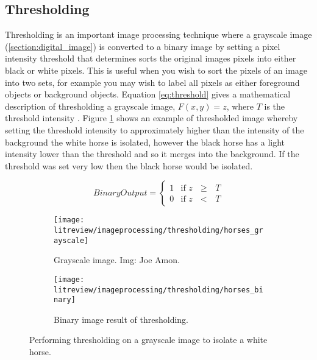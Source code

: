 \subsection{Thresholding}
\label{subsection:thresholding}
Thresholding is an important image processing technique where a grayscale image (\ref{section:digital_image}) is converted to a binary image by setting a pixel intensity threshold that determines sorts the original images pixels into either black or white pixels. This is useful when you wish to sort the pixels of an image into two sets, for example you may wish to label all pixels as either foreground objects or background objects. Equation \ref{eq:threshold} gives a mathematical description of thresholding a grayscale image, $F(x,y) = z$, where $T$ is the threshold intensity \cite{alg_apps}. Figure \ref{fig:threshex} shows an example of thresholded image whereby setting the threshold intensity to approximately higher than the intensity of the background the white horse is isolated, however the black horse has a light intensity lower than the threshold and so it merges into the background. If the threshold was set very low then the black horse would be isolated.

\begin{equation}
  Binary Output = 
  \begin{cases}
    1 & \text{if $z$ $\geq$ $T$} \\
    0 & \text{if $z$ $<$  $T$}
  \end{cases}
  \label{eq:threshold}
\end{equation}

\begin{figure}[H]
	\centering
	    \begin{subfigure}[b]{0.45\linewidth}
      		\centering\texttt{[image: litreview/imageprocessing/thresholding/horses\_grayscale]}
      		\caption{Grayscale image. Img: Joe Amon.}
    	\end{subfigure}
    	\begin{subfigure}[b]{0.45\linewidth}
      		\centering\texttt{[image: litreview/imageprocessing/thresholding/horses\_binary]}
      		\caption{Binary image result of thresholding.}
    	\end{subfigure}
    	\caption{Performing thresholding on a grayscale image to isolate a white horse.}
    	\label{fig:threshex}
\end{figure}
